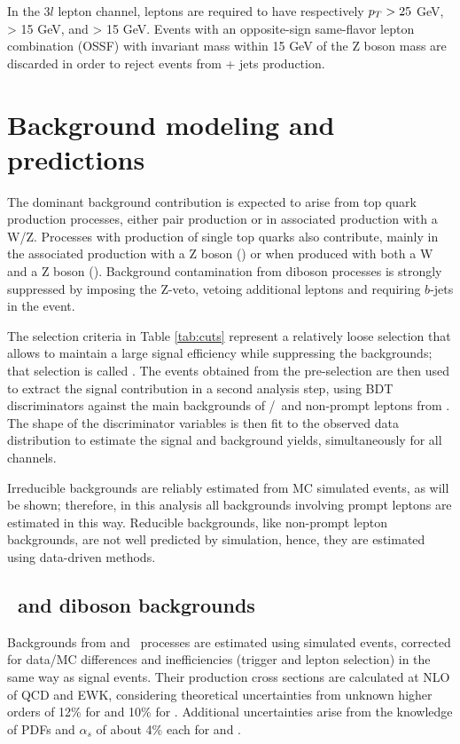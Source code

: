 In the $3l$ lepton channel, leptons are required to have respectively $p_T > 25$ GeV, > 15 GeV, and > 15  GeV. Events with an opposite-sign same-flavor lepton combination (OSSF) with invariant mass within 15 GeV of the Z boson mass are discarded in order to reject events from \WZ + jets production.

\section{Background modeling and predictions}\label{sec:bg_pred}

The dominant background contribution is expected to arise from top quark production processes, either \ttbar pair production or in \ttbar associated production with a W/Z. Processes with production of single top quarks also contribute, mainly in the associated production with a Z boson (\tZq) or when produced with both a W and a Z boson (\tZW). Background contamination from diboson processes is strongly suppressed by imposing the Z-veto, vetoing additional leptons and requiring $b$-jets in the event.

The selection criteria in Table \ref{tab:cuts} represent a relatively loose selection that allows to maintain a large signal efficiency while suppressing the backgrounds; that selection is called . The events obtained from the pre-selection are then used to extract the signal contribution in a second analysis step, using BDT discriminators against the main backgrounds of \ttW/\ttZ\ and non-prompt leptons from \ttbar. The shape of the discriminator variables is then fit to the observed data distribution to estimate the signal and background yields, simultaneously for all channels.

Irreducible backgrounds are reliably estimated from MC simulated events, as will be shown; therefore, in this analysis all backgrounds involving prompt leptons are estimated in this way. Reducible backgrounds, like non-prompt lepton backgrounds, are not well predicted by simulation, hence, they are estimated using data-driven methods.

\subsection{\ttV\ and diboson backgrounds}

Backgrounds from \ttW and \ttZ\ processes are estimated using simulated events, corrected for data/MC differences and inefficiencies (trigger and lepton selection) in the same way as signal events. Their production cross sections are calculated at NLO of QCD and EWK, considering theoretical uncertainties from unknown higher orders of 12\% for \ttW and 10\% for \ttZ. Additional uncertainties arise from the knowledge of PDFs and $\alpha_s$ of about 4\% each for \ttW and \ttZ.

